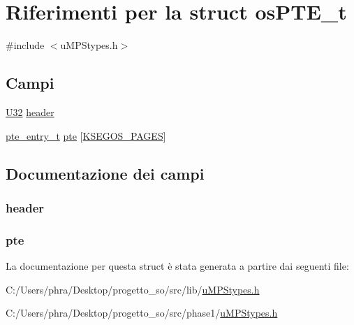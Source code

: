 \hypertarget{structos_p_t_e__t}{\section{Riferimenti per la struct os\-P\-T\-E\-\_\-t}
\label{structos_p_t_e__t}
}


{\ttfamily \#include $<$u\-M\-P\-Stypes.\-h$>$}

\subsection*{Campi}
\begin{DoxyCompactItemize}
\item 
\hyperlink{lib_2base_8h_ac3df7cf3c8cb172a588adec881447d68}{U32} \hyperlink{structos_p_t_e__t_a45eed61436d7fec550ec1071e528d577}{header}
\item 
\hyperlink{structpte__entry__t}{pte\-\_\-entry\-\_\-t} \hyperlink{structos_p_t_e__t_a4b0494719d6e84b6e12eaa135cd54532}{pte} \mbox{[}\hyperlink{phase1_2const_8h_ab5c2c6e008c8304671037d897fe670e7}{K\-S\-E\-G\-O\-S\-\_\-\-P\-A\-G\-E\-S}\mbox{]}
\end{DoxyCompactItemize}


\subsection{Documentazione dei campi}
\hypertarget{structos_p_t_e__t_a45eed61436d7fec550ec1071e528d577}{
\subsubsection[{header}]{ header}}\label{structos_p_t_e__t_a45eed61436d7fec550ec1071e528d577}
\hypertarget{structos_p_t_e__t_a4b0494719d6e84b6e12eaa135cd54532}{
\subsubsection[{pte}]{ pte}}\label{structos_p_t_e__t_a4b0494719d6e84b6e12eaa135cd54532}


La documentazione per questa struct è stata generata a partire dai seguenti file\-:\begin{DoxyCompactItemize}
\item 
C\-:/\-Users/phra/\-Desktop/progetto\-\_\-so/src/lib/\hyperlink{lib_2u_m_p_stypes_8h}{u\-M\-P\-Stypes.\-h}\item 
C\-:/\-Users/phra/\-Desktop/progetto\-\_\-so/src/phase1/\hyperlink{phase1_2u_m_p_stypes_8h}{u\-M\-P\-Stypes.\-h}\end{DoxyCompactItemize}
